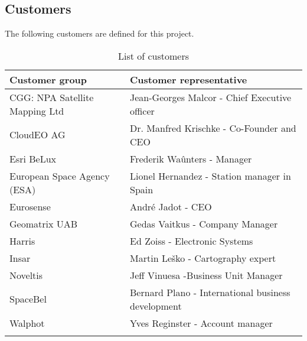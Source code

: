 \subsection{Customers}

{The following customers are defined for this project.}
\begin{small}	
\begin{longtable}{ll}
	
	\toprule[2pt]
	
	\textbf{Customer group}    & \textbf{Customer representative}
	\\ \midrule[1.5pt]
	
	CGG: NPA Satellite Mapping Ltd & Jean-Georges Malcor - Chief Executive officer\\
	CloudEO AG & Dr. Manfred Krischke - Co-Founder and CEO\\
	Esri BeLux & Frederik Waûnters - Manager\\
	European Space Agency (ESA) & Lionel Hernandez - Station manager in Spain\\
	Eurosense&André Jadot - CEO\\
	Geomatrix UAB & Gedas Vaitkus - Company Manager\\
	Harris&Ed Zoiss - Electronic Systems\\
	Insar&Martin Leško - Cartography expert\\
	Noveltis&Jeff Vinuesa -Business Unit Manager\\
	SpaceBel&Bernard Plano - International business development\\
	Walphot&Yves Reginster - Account manager
	\\ \bottomrule[2pt]
	
	\caption{List of customers}
	\label{table_customers}
\end{longtable}
\end{small}	